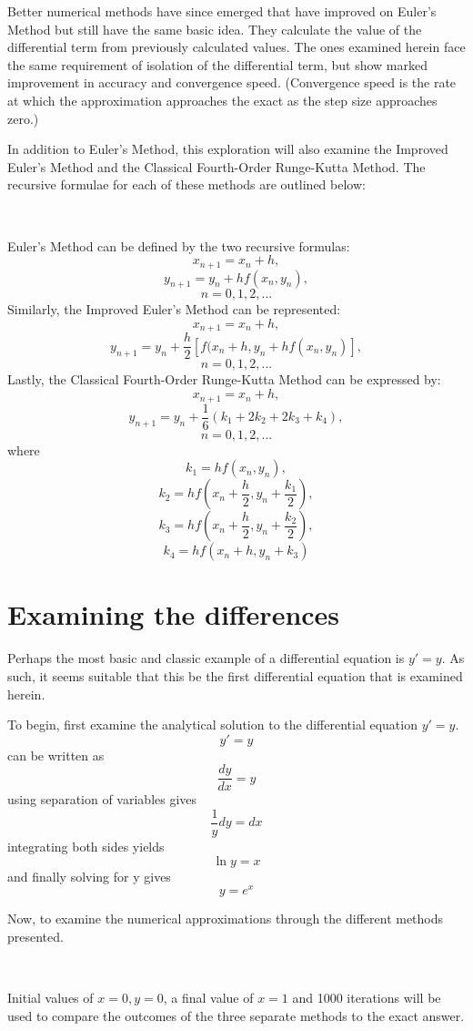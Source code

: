 \documentclass[12pt, letterpaper]{report}
\begin{document}
Better numerical methods have since emerged that have improved on Euler's Method but still have the same basic idea. They calculate the value of the differential term from previously calculated values. The ones examined herein face the same requirement of isolation of the differential term, but show marked improvement in accuracy and convergence speed. (Convergence speed is the rate at which the approximation approaches the exact as the step size approaches zero.)

In addition to Euler's Method, this exploration will also examine the Improved Euler's Method and the Classical Fourth-Order Runge-Kutta Method. The recursive formulae for each of these methods are outlined below:


\

Euler's Method can be defined by the two recursive formulas:
\[x_{n+1}=x_n+h,\]
\[y_{n+1}=y_n+hf(x_n,y_n),\]
\[n=0,1,2,...\]
Similarly, the Improved Euler's Method can be represented:
\[x_{n+1}=x_n+h,\]
\[y_{n+1}=y_n+\frac{h}{2}[f(x_n+h,y_n+hf(x_n,y_n)],\]
\[n=0,1,2,...\]
Lastly, the Classical Fourth-Order Runge-Kutta Method can be expressed by:
\[x_{n+1}=x_n+h,\]
\[y_{n+1}=y_n+\frac{1}{6}(k_1+2k_2+2k_3+k_4),\]
\[n=0,1,2,...\]
where
\[k_1=hf(x_n,y_n),\]
\[k_2=hf(x_n+\frac{h}{2},y_n+\frac{k_1}{2}),\]
\[k_3=hf(x_n+\frac{h}{2},y_n+\frac{k_2}{2}),\]
\[k_4=hf(x_n+h,y_n+k_3)\]

\section*{Examining the differences}

Perhaps the most basic and classic example of a differential equation is \(y'=y\). As such, it seems suitable that this be the first differential equation that is examined herein.

To begin, first examine the analytical solution to the differential equation \(y'=y\).
\[y'=y\]can be written as \[\frac{dy}{dx}=y\] using separation of variables gives \[\frac{1}{y}dy=dx\] integrating both sides yields \[\ln{y}=x\] and finally solving for y gives \[y=e^x\]

Now, to examine the numerical approximations through the different methods presented.


\


Initial values of \(x=0, y=0\), a final value of \(x=1\) and 1000 iterations will be used to compare the outcomes of the three separate methods to the exact answer.
\end{document}
